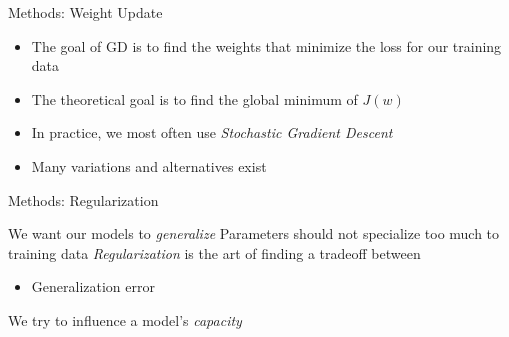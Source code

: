 \begin{slide}{Methods: Weight Update}
  \centering
  \begin{itemize}
    \item<1-> The goal of GD is to find the weights that minimize the loss for our training data
    \item<2-> The theoretical goal is to find the global minimum of $J(w)$
    \item<3-> In practice, we most often use \emph{Stochastic Gradient Descent}
    \item<4-> Many variations and alternatives exist
  \end{itemize}
  \vspace{0.3cm}

\end{slide}

\begin{slide}{Methods: Regularization}
  \begin{itemize}
    \pitem We want our models to \emph{generalize}
    \pitem Parameters should not specialize too much to training data
    \pitem \emph{Regularization} is the art of finding a tradeoff between
    \begin{itemize}
      \pitem Training error
      \item Generalization error
    \end{itemize}
    \pitem We try to influence a model's \emph{capacity}
  \end{itemize}
\end{slide}

